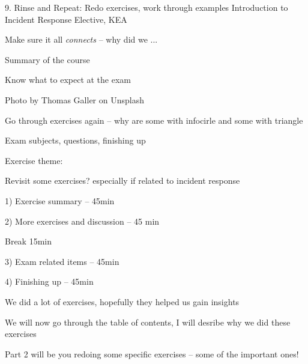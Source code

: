 \documentclass[Screen16to9,17pt]{foils}
\begin{document}
\mytitlepage
{9. Rinse and Repeat: Redo exercises, work through examples}
{Introduction to Incident Response Elective, KEA}




\begin{list2}
\item Make sure it all \emph{connects} -- why did we ...
\item Summary of the course
\item Know what to expect at the exam
\end{list2}

{\hfill \small Photo by Thomas Galler on Unsplash}


\begin{list2}
\item Go through exercises again -- why are some with infocirle and some with triangle
\item Exam subjects, questions, finishing up
\end{list2}

Exercise theme:
\begin{list2}
\item Revisit some exercises? especially if related to incident response
\end{list2}



\begin{list2}
\item 1) Exercise summary -- 45min
\item 2) More exercises and discussion -- 45 min
\item Break 15min
\item 3) Exam related items -- 45min
\item 4) Finishing up -- 45min
\end{list2}



We did a lot of exercises, hopefully they helped us gain insights

\begin{list2}
\item We will now go through the table of contents, I will desribe why we did these exercises
\item Part 2 will be you redoing some specific exercises -- some of the important ones!
\end{list2}
\end{document}
